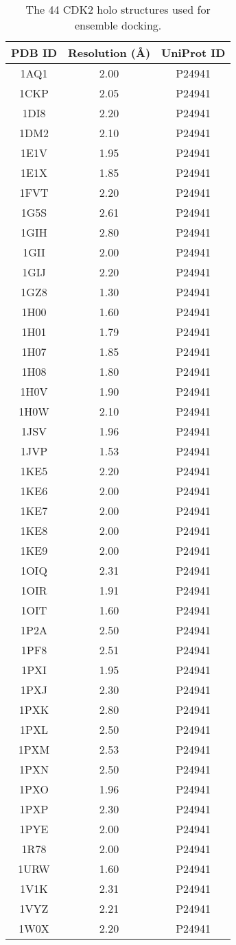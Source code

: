 \begin{table}
\caption{The 44 CDK2 holo structures used for ensemble docking.}
\label{cdk2:PDBs}
\begin{tabular}{ccc}
\hline
PDB ID & Resolution (\AA) & UniProt ID\\
\hline
1AQ1 & 2.00 & P24941\\
1CKP & 2.05 & P24941\\
1DI8 & 2.20 & P24941\\
1DM2 & 2.10 & P24941\\
1E1V & 1.95 & P24941\\
1E1X & 1.85 & P24941\\
1FVT & 2.20 & P24941\\
1G5S & 2.61 & P24941\\
1GIH & 2.80 & P24941\\
1GII & 2.00 & P24941\\
1GIJ & 2.20 & P24941\\
1GZ8 & 1.30 & P24941\\
1H00 & 1.60 & P24941\\
1H01 & 1.79 & P24941\\
1H07 & 1.85 & P24941\\
1H08 & 1.80 & P24941\\
1H0V & 1.90 & P24941\\
1H0W & 2.10 & P24941\\
1JSV & 1.96 & P24941\\
1JVP & 1.53 & P24941\\
1KE5 & 2.20 & P24941\\
1KE6 & 2.00 & P24941\\
1KE7 & 2.00 & P24941\\
1KE8 & 2.00 & P24941\\
1KE9 & 2.00 & P24941\\
1OIQ & 2.31 & P24941\\
1OIR & 1.91 & P24941\\
1OIT & 1.60 & P24941\\
1P2A & 2.50 & P24941\\
1PF8 & 2.51 & P24941\\
1PXI & 1.95 & P24941\\
1PXJ & 2.30 & P24941\\
1PXK & 2.80 & P24941\\
1PXL & 2.50 & P24941\\
1PXM & 2.53 & P24941\\
1PXN & 2.50 & P24941\\
1PXO & 1.96 & P24941\\
1PXP & 2.30 & P24941\\
1PYE & 2.00 & P24941\\
1R78 & 2.00 & P24941\\
1URW & 1.60 & P24941\\
1V1K & 2.31 & P24941\\
1VYZ & 2.21 & P24941\\
1W0X & 2.20 & P24941\\
\hline
\end{tabular}
\end{table}

